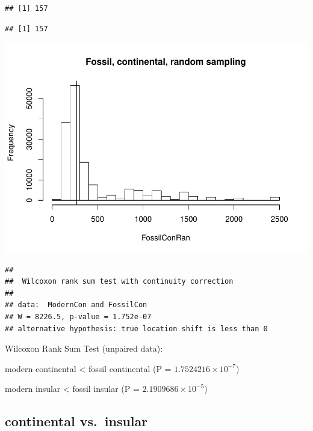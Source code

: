 \documentclass[]{article}
\begin{document}
\begin{verbatim}
## [1] 157
\end{verbatim}

\begin{verbatim}
## [1] 157
\end{verbatim}

\includegraphics{MA_JJ_files/figure-latex/randon sampling modern fossil, island continental-2.pdf}

\begin{verbatim}
## 
##  Wilcoxon rank sum test with continuity correction
## 
## data:  ModernCon and FossilCon
## W = 8226.5, p-value = 1.752e-07
## alternative hypothesis: true location shift is less than 0
\end{verbatim}

Wilcoxon Rank Sum Test (unpaired data):

modern continental \textless{} fossil continental (P =
\(1.7524216\times 10^{-7}\))

modern insular \textless{} fossil insular (P =
\(2.1909686\times 10^{-5}\))

\newpage

\subsection{continental vs.~insular}\label{continental-vs.insular-1}
\end{document}
